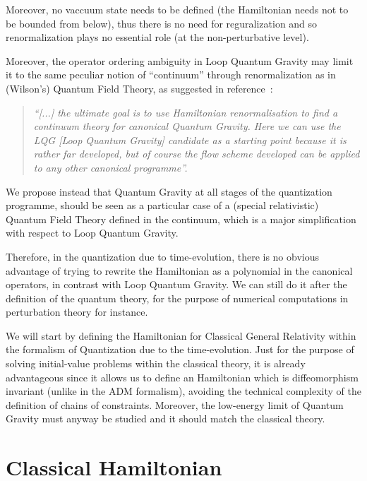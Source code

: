 \documentclass[11pt]{book}
\begin{document}
Moreover, no vaccuum state needs to be defined (the Hamiltonian needs
not to be bounded from below), thus there is no need for reguralization
and so renormalization plays no essential role (at the non-perturbative
level).

Moreover, the operator ordering ambiguity in Loop Quantum Gravity may
limit it to the same peculiar notion of ``continuum'' through
renormalization as in (Wilson's) Quantum Field Theory, as suggested in
reference~\cite{Thiemann2020Canonical}:

\begin{quote}
\emph{``{[}...{]} the ultimate goal is to use Hamiltonian
renormalisation to find a continuum theory for canonical Quantum
Gravity. Here we can use the LQG {[}Loop Quantum Gravity{]} candidate as
a starting point because it is rather far developed, but of course the
flow scheme developed can be applied to any other canonical
programme''.}
\end{quote}

We propose instead that Quantum Gravity at all stages of the
quantization programme, should be seen as a particular case of a
(special relativistic) Quantum Field Theory defined in the continuum,
which is a major simplification with respect to Loop Quantum Gravity.

Therefore, in the quantization due to time-evolution, there is no
obvious advantage of trying to rewrite the Hamiltonian as a polynomial
in the canonical operators, in contrast with Loop Quantum Gravity. We
can still do it after the definition of the quantum
theory\cite{Katanaev2006Polynomial},
for the purpose of numerical computations in perturbation theory for
instance.

We will start by defining the Hamiltonian for Classical General
Relativity within the formalism of Quantization due to the
time-evolution. Just for the purpose of solving initial-value problems
within the classical theory, it is already advantageous since it allows
us to define an Hamiltonian which is diffeomorphism invariant (unlike in
the ADM formalism\cite{Charap1988Explicit}\cite{Deser1976Canonical}), avoiding the technical complexity of the definition of chains
of
constraints\cite{Kiriushcheva2011Hamiltonian}. Moreover, the low-energy limit of Quantum Gravity
must anyway be studied and it should match the classical theory.

\hypertarget{classical-hamiltonian}{%
\section{Classical Hamiltonian}\label{classical-hamiltonian}}
\end{document}

